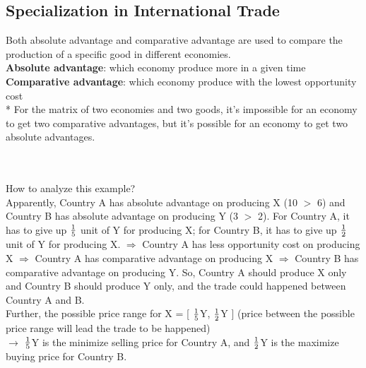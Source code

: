 \documentclass[UTF8]{article}
\begin{document}
\newpage
\subsection{Specialization in International Trade}
Both absolute advantage and comparative advantage are used to compare the production of a specific good in different economies. \\
\textbf{Absolute advantage}: which economy produce more in a given time \\
\textbf{Comparative advantage}: which economy produce with the lowest opportunity cost \\
* For the matrix of two economies and two goods, it's impossible for an economy to get two comparative advantages, but it's possible for an economy to get two absolute advantages.\\
\\
\\
\begin{table}[!h]
\centering
{}
\caption{example (production per hour)}
\end{table}

\noindent
How to analyze this example?\\
Apparently, Country A has absolute advantage on producing X (10 $>$ 6) and Country B has absolute advantage on producing Y (3 $>$ 2). For Country A, it has to give up $1\over 5$ unit of Y for producing X; for Country B, it has to give up $1\over 2$ unit of Y for producing X. $\Longrightarrow$ Country A has less opportunity cost on producing X $\Longrightarrow$ Country A has comparative advantage on producing X $\Longrightarrow$ Country B has comparative advantage on producing Y. So, Country A should produce X only and Country B should produce Y only, and the trade could happened between Country A and B.\\
Further, the possible price range for X = [ $1\over 5$Y, $1\over 2$Y ] (price between the possible price range will lead the trade to be happened)\\
$\rightarrow$ $1\over5$Y is the minimize selling price for Country A, and $1\over2$Y is the maximize buying price for Country B.\\
\end{document}
